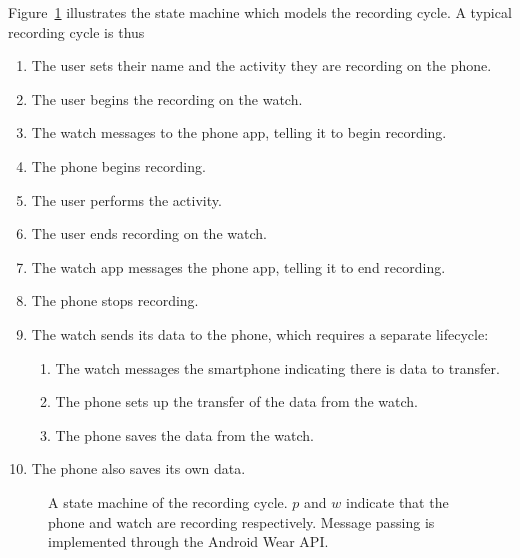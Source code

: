      Figure~\ref{fig:recordingstatemachine} illustrates the state machine which models the recording cycle. A typical recording cycle is thus
      \begin{enumerate}
        \item The user sets their name and the activity they are recording on the phone.
        \item The user begins the recording on the watch.
        \item The watch messages to the phone app, telling it to begin recording.
        \item The phone begins recording.
        \item The user performs the activity.
        \item The user ends recording on the watch.
        \item The watch app messages the phone app, telling it to end recording.
        \item The phone stops recording.
        \item The watch sends its data to the phone, which requires a separate lifecycle:
        \begin{enumerate}
          \item The watch messages the smartphone indicating there is data to transfer.
          \item The phone sets up the transfer of the data from the watch.
          \item The phone saves the data from the watch.
        \end{enumerate}
        \item The phone also saves its own data.
      \end{enumerate}
      
      \begin{figure}[!th]
        \centering
        \caption{A state machine of the recording cycle. $p$ and $w$ indicate that the phone and watch are recording respectively. Message passing is implemented through the Android Wear API.}
        \label{fig:recordingstatemachine}
      \end{figure}
      
